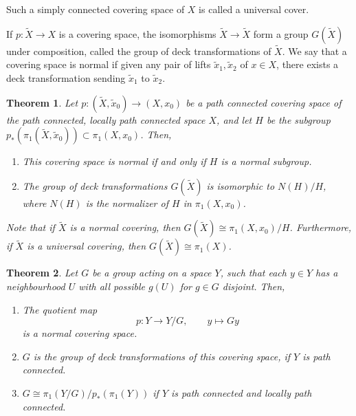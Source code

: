 \documentclass[12pt]{article}
\newtheorem{theorem}{Theorem}[section]
\theoremstyle{definition}
\theoremstyle{remark}
\begin{document}
    Such a simply connected covering space of $X$ is called a universal cover. 

    If $p\colon \tilde{X} \to X$ is a covering space, the isomorphisms $\tilde{X} \to
    \tilde{X}$ form a group $G(\tilde{X})$ under composition, called the group of
    deck transformations of $\tilde{X}$. We say that a covering space is normal if
    given any pair of lifts $\tilde{x}_1, \tilde{x}_2$ of $x \in X$, there exists a
    deck transformation sending $\tilde{x}_1$ to $\tilde{x}_2$.


    \begin{theorem}
        Let $p\colon (\tilde{X}, \tilde{x}_0) \to (X, x_0)$ be a path connected
        covering space of the path connected, locally path connected space $X$, and
        let $H$ be the subgroup $p_*(\pi_1(\tilde{X}, \tilde{x}_0)) \subset \pi_1(X,
        x_0)$. Then, \begin{enumerate}
            \item This covering space is normal if and only if $H$ is a normal
            subgroup.
            \item The group of deck transformations $G(\tilde{X})$ is isomorphic to
            $N(H) / H$, where $N(H)$ is the normalizer of $H$ in $\pi_1(X, x_0)$.
        \end{enumerate}
        Note that if $\tilde{X}$ is a normal covering, then $G(\tilde{X}) \cong
        \pi_1(X, x_0) / H$. Furthermore, if $\tilde{X}$ is a universal covering, then
        $G(\tilde{X}) \cong \pi_1(X)$.
    \end{theorem}


    \begin{theorem}\label{th:group_quotient}
        Let $G$ be a group acting on a space $Y$, such that each $y \in Y$ has a
        neighbourhood $U$ with all possible $g(U)$ for $g \in G$ disjoint. Then, \begin{enumerate}
            \item The quotient map \[
                p\colon Y \to Y / G, \qquad y \mapsto Gy
            \] is a normal covering space.
            \item $G$ is the group of deck transformations of this covering space, if
            $Y$ is path connected.
            \item $G\cong \pi_1(Y / G) / p_*(\pi_1(Y))$ if $Y$ is path connected and
            locally path connected.
        \end{enumerate}
    \end{theorem}
\end{document}
